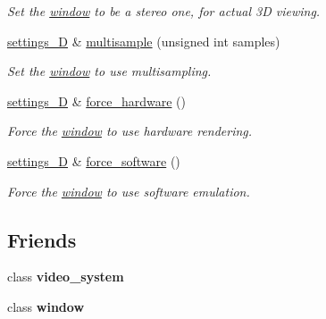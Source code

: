 \begin{DoxyCompactItemize}
\begin{DoxyCompactList}\small\item\em Set the \hyperlink{classgfx_1_1window}{window} to be a stereo one, for actual 3\-D viewing. \end{DoxyCompactList}\item 
\hyperlink{classgfx_1_1window_1_1settings__3D}{settings\-\_\-D} \& \hyperlink{classgfx_1_1window_1_1settings__3D_a2234f6270bc904a20efd4fe263e298de}{multisample} (unsigned int samples)
\begin{DoxyCompactList}\small\item\em Set the \hyperlink{classgfx_1_1window}{window} to use multisampling. \end{DoxyCompactList}\item 
\hyperlink{classgfx_1_1window_1_1settings__3D}{settings\-\_\-D} \& \hyperlink{classgfx_1_1window_1_1settings__3D_a7c87fbab1fa23f98667efecbe0e0a87b}{force\-\_\-hardware} ()
\begin{DoxyCompactList}\small\item\em Force the \hyperlink{classgfx_1_1window}{window} to use hardware rendering. \end{DoxyCompactList}\item 
\hyperlink{classgfx_1_1window_1_1settings__3D}{settings\-\_\-D} \& \hyperlink{classgfx_1_1window_1_1settings__3D_a0392fbca283e0e0a883913af91d38f69}{force\-\_\-software} ()
\begin{DoxyCompactList}\small\item\em Force the \hyperlink{classgfx_1_1window}{window} to use software emulation. \end{DoxyCompactList}\end{DoxyCompactItemize}
\subsection*{Friends}
\begin{DoxyCompactItemize}
\item 
\hypertarget{classgfx_1_1window_1_1settings__3D_abfd69a86b028655cf7807981b1c58526}{class {\bfseries video\-\_\-system}}\label{classgfx_1_1window_1_1settings__3D_abfd69a86b028655cf7807981b1c58526}

\item 
\hypertarget{classgfx_1_1window_1_1settings__3D_a4b01d44f6fa9d0aac31c5905d42c0404}{class {\bfseries window}}\label{classgfx_1_1window_1_1settings__3D_a4b01d44f6fa9d0aac31c5905d42c0404}

\end{DoxyCompactItemize}


